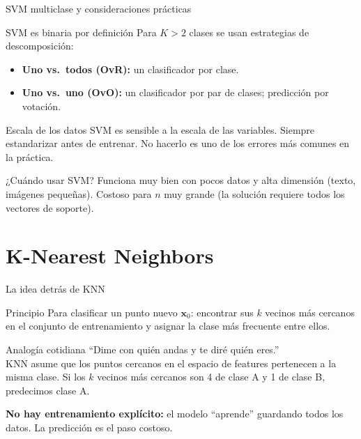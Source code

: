 \documentclass[aspectratio=169]{beamer}
\newcommand{\bx}{\bm{x}}
\begin{document}
\begin{frame}{SVM multiclase y consideraciones prácticas}
  \begin{block}{SVM es binaria por definición}
    Para $K > 2$ clases se usan estrategias de descomposición:
    \begin{itemize}
      \item \textbf{Uno vs.\ todos (OvR):} un clasificador por clase.
      \item \textbf{Uno vs.\ uno (OvO):} un clasificador por par de clases; predicción por votación.
    \end{itemize}
  \end{block}

  \medskip
  \begin{alertblock}{Escala de los datos}
    SVM es sensible a la escala de las variables. Siempre estandarizar antes de entrenar.
    No hacerlo es uno de los errores más comunes en la práctica.
  \end{alertblock}

  \medskip
  \begin{exampleblock}{¿Cuándo usar SVM?}
    Funciona muy bien con pocos datos y alta dimensión (texto, imágenes pequeñas).
    Costoso para $n$ muy grande (la solución requiere todos los vectores de soporte).
  \end{exampleblock}
\end{frame}

\section{K-Nearest Neighbors}

\begin{frame}{La idea detrás de KNN}
  \begin{block}{Principio}
    Para clasificar un punto nuevo $\bx_0$:
    encontrar sus $k$ vecinos más cercanos en el conjunto de entrenamiento
    y asignar la clase más frecuente entre ellos.
  \end{block}

  \medskip
  \begin{exampleblock}{Analogía cotidiana}
    ``Dime con quién andas y te diré quién eres.''\\
    KNN asume que los puntos cercanos en el espacio de features pertenecen
    a la misma clase. Si los $k$ vecinos más cercanos son 4 de clase A y 1 de clase B,
    predecimos clase A.
  \end{exampleblock}

  \medskip
  \textbf{No hay entrenamiento explícito:} el modelo ``aprende'' guardando todos los datos.
  La predicción es el paso costoso.
\end{frame}
\end{document}
